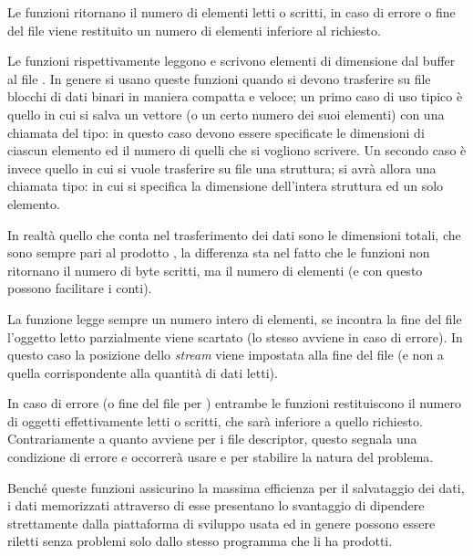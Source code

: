 \begin{funcproto}{
}

{Le funzioni ritornano il numero di elementi letti o scritti, in caso di
  errore o fine del file viene restituito un numero di elementi inferiore al
  richiesto.}
\end{funcproto}

Le funzioni rispettivamente leggono e scrivono  elementi di
dimensione  dal buffer  al file .  In
genere si usano queste funzioni quando si devono trasferire su file blocchi di
dati binari in maniera compatta e veloce; un primo caso di uso tipico è quello
in cui si salva un vettore (o un certo numero dei suoi elementi) con una
chiamata del tipo:
in questo caso devono essere specificate le dimensioni di ciascun
elemento ed il numero di quelli che si vogliono scrivere. Un secondo
caso è invece quello in cui si vuole trasferire su file una struttura;
si avrà allora una chiamata tipo:
in cui si specifica la dimensione dell'intera struttura ed un solo
elemento. 

In realtà quello che conta nel trasferimento dei dati sono le dimensioni
totali, che sono sempre pari al prodotto , la differenza
sta nel fatto che le funzioni non ritornano il numero di byte scritti, ma il
numero di elementi (e con questo possono facilitare i conti).

La funzione  legge sempre un numero intero di elementi, se
incontra la fine del file l'oggetto letto parzialmente viene scartato (lo
stesso avviene in caso di errore). In questo caso la posizione dello
\textit{stream} viene impostata alla fine del file (e non a quella
corrispondente alla quantità di dati letti).

In caso di errore (o fine del file per ) entrambe le
funzioni restituiscono il numero di oggetti effettivamente letti o
scritti, che sarà inferiore a quello richiesto. Contrariamente a quanto
avviene per i file descriptor, questo segnala una condizione di errore e
occorrerà usare  e  per stabilire la natura del
problema.

Benché queste funzioni assicurino la massima efficienza per il
salvataggio dei dati, i dati memorizzati attraverso di esse presentano
lo svantaggio di dipendere strettamente dalla piattaforma di sviluppo
usata ed in genere possono essere riletti senza problemi solo dallo
stesso programma che li ha prodotti.

